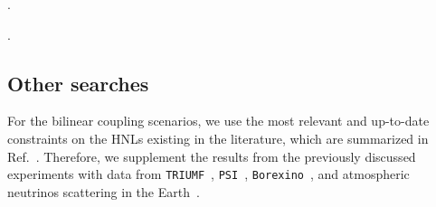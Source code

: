 {\color{white}.

.}

\subsection{Other searches}
For the bilinear coupling scenarios, we use the most relevant and up-to-date constraints on the HNLs existing in the literature, which are summarized in Ref.~\cite{Fernandez-Martinez:2023phj}.
Therefore, we supplement the results from the previously discussed experiments with data from \texttt{TRIUMF}~\cite{Britton:1992xv}, 
\texttt{PSI}~\cite{Daum:1987bg}, \texttt{Borexino}~\cite{Borexino:2013bot,Plestid:2020ssy}, and atmospheric 
neutrinos scattering in the Earth~\cite{Dentler:2018sju}.





